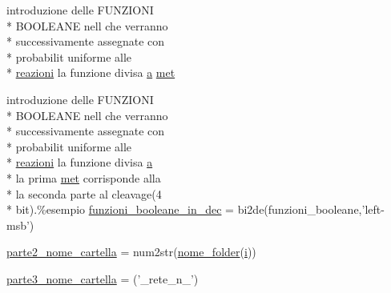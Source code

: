 \begin{DoxyCompactItemize}
$$\item 
introduzione delle F\-U\-N\-Z\-I\-O\-N\-I \\*
B\-O\-O\-L\-E\-A\-N\-E nell che verranno \\*
successivamente assegnate con \\*
probabilit uniforme alle \\*
\hyperlink{a00113_a69962f56e60d0c88abc5d4b6839c2886}{reazioni} la funzione divisa \hyperlink{a00035_a2ffdbad9ea59541e59cbd2b938e0770c}{a} \hyperlink{a00113_a53f2a5c181e46a513a4e87f144d19f6b}{met}
\item 
introduzione delle F\-U\-N\-Z\-I\-O\-N\-I \\*
B\-O\-O\-L\-E\-A\-N\-E nell che verranno \\*
successivamente assegnate con \\*
probabilit uniforme alle \\*
\hyperlink{a00113_a69962f56e60d0c88abc5d4b6839c2886}{reazioni} la funzione divisa \hyperlink{a00035_a2ffdbad9ea59541e59cbd2b938e0770c}{a} \\*
la prima \hyperlink{a00113_a53f2a5c181e46a513a4e87f144d19f6b}{met} corrisponde alla \\*
la seconda parte al cleavage(4 \\*
bit).\%esempio \hyperlink{a00113_af44cf9f59bd0c10b4d2aa541bd7c156b}{funzioni\-\_\-booleane\-\_\-in\-\_\-dec} = bi2de(funzioni\-\_\-booleane,'left-\/msb')
\item 
\hyperlink{a00113_a18f9e9dff2c5a2fe455a8d41fa6860fa}{parte2\-\_\-nome\-\_\-cartella} = num2str(\hyperlink{a00113_a277bc625a7a558f74ccc1eb2963d70d0}{nome\-\_\-folder}(\hyperlink{a00113_ad3efca1ea6e3333daf30719ee0501862}{i}))
\item 
\hyperlink{a00113_a1795e2dc228962c5b67eaee336bba2ad}{parte3\-\_\-nome\-\_\-cartella} = ('\-\_\-rete\-\_\-n\-\_\-')
\end{DoxyCompactItemize}


